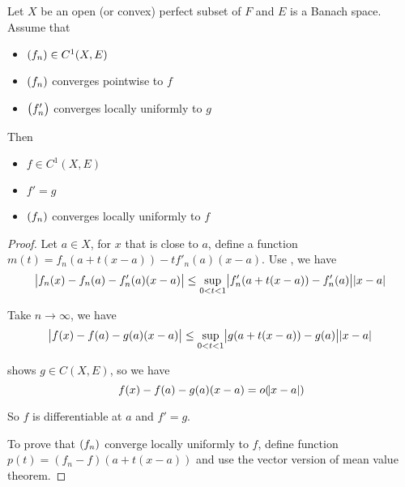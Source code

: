 \begin{theorem}
    Let $X$ be an open (or convex) perfect subset of $F$ and $E$ is a Banach space. Assume that
    \begin{itemize}
        \item $\sequence{f_n} \in C^1(X,E)$
        \item $\sequence{f_n}$ converges pointwise to $f$
        \item $\sequence{f'_n}$ converges locally uniformly to $g$
    \end{itemize}
    
    Then
    \begin{itemize}
        \item $f \in C^1(X,E)$
        \item $f' = g$
        \item $\sequence{f_n}$ converges locally uniformly to $f$
    \end{itemize}
\end{theorem}
\begin{proof}
    Let $a \in X$, for $x$ that is close to $a$, define a function $m(t) = f_n(a + t(x-a)) - t f'_n(a)(x-a)$. Use , we have
    \begin{equation}
        \abs{f_n(x) - f_n(a) - f'_n(a)(x-a)} \leq \sup_{0 < t < 1}\abs{f'_n(a + t(x-a)) - f'_n(a)} \abs{x-a}
    \end{equation}
    
    Take $n \rightarrow \infty$, we have
    \begin{equation}
        \abs{f(x) - f(a) - g(a)(x-a)} \leq \sup_{0 < t < 1}\abs{g(a + t(x-a)) - g(a)} \abs{x-a}
    \end{equation}
    
     shows $g \in C(X,E)$, so we have
    \begin{equation}
        f(x) - f(a) -g(a)(x-a) = o(\abs{x-a})
    \end{equation}
    
    So $f$ is differentiable at $a$ and $f' = g$.
    
    To prove that $\sequence{f_n}$ converge locally uniformly to $f$, define function $p(t) = (f_n - f)(a + t(x-a))$ and use the vector version of mean value theorem.
\end{proof}

